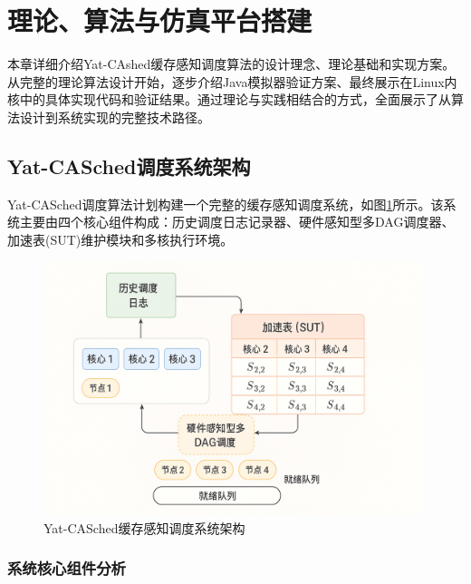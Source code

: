 
\section{理论、算法与仿真平台搭建} \label{sec:theory}

\begin{tcolorbox}[
    colback=blue!5!white,
    colframe=blue!50!black,
    title=\textbf{本章内容概述},
    fonttitle=\bfseries,
    arc=3pt
]
本章详细介绍Yat-CAshed缓存感知调度算法的设计理念、理论基础和实现方案。从完整的理论算法设计开始，逐步介绍Java模拟器验证方案、最终展示在Linux内核中的具体实现代码和验证结果。通过理论与实践相结合的方式，全面展示了从算法设计到系统实现的完整技术路径。
\end{tcolorbox}

\subsection{Yat-CASched调度系统架构}

Yat-CASched调度算法计划构建一个完整的缓存感知调度系统，如图\ref{fig:yat_overview}所示。该系统主要由四个核心组件构成：历史调度日志记录器、硬件感知型多DAG调度器、加速表(SUT)维护模块和多核执行环境。
\begin{figure}[htbp]
\centering
\includegraphics[width=0.99\textwidth]{img/yat_casched_overview.png}

\centering

\caption{Yat-CASched缓存感知调度系统架构}
\label{fig:yat_overview}
\end{figure}
\subsubsection{系统核心组件分析}

